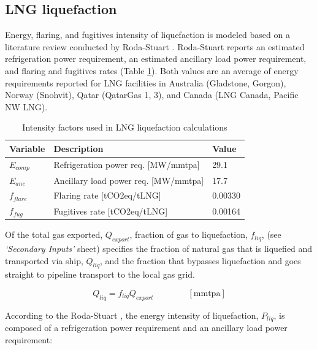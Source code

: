 \documentclass[11pt]{report}
\newcommand{\sheet}[1]{\textit{`{#1}'}}
\newcommand{\eqnunit}[1]{\quad\quad \scriptstyle{\left[\text{#1}\right]}}
\begin{document}
\subsection{LNG liquefaction}

Energy, flaring, and fugitives intensity of liquefaction is modeled based on a literature review conducted by Roda-Stuart \cite{RodaStuart2018}. Roda-Stuart reports an estimated refrigeration power requirement, an estimated ancillary load power requirement, and flaring and fugitives rates (Table \ref{tab:liquefaction}). Both values are an average of energy requirements reported for LNG facilities in Australia (Gladstone, Gorgon), Norway (Snohvit), Qatar (QatarGas 1, 3), and Canada (LNG Canada, Pacific NW LNG).

\begin{table}[ht]
\begin{scriptsize}
\caption{Intensity factors used in LNG liquefaction calculations}
\label{tab:liquefaction}
\begin{tabular*}{0.8\columnwidth}{p{}p{}p{}}
\toprule
Variable & Description & Value \\
\midrule
$E_{comp}$ & Refrigeration power req. [MW/mmtpa] & 29.1 \\
$E_{anc}$ & Ancillary load power req. [MW/mmtpa] & 17.7 \\
$f_{flare}$ & Flaring rate [tCO2eq/tLNG] & 0.00330 \\
$f_{fug}$ & Fugitives rate [tCO2eq/tLNG] & 0.00164 \\
\bottomrule
\end{tabular*}
\end{scriptsize}
\end{table}

Of the total gas exported, $Q_{export}$, fraction of gas to liquefaction, $f_{liq}$, (see \sheet{Secondary Inputs} sheet) specifies the fraction of natural gas that is liquefied and transported via ship, $Q_{liq}$, and the fraction that bypasses liquefaction and goes straight to pipeline transport to the local gas grid. 

\begin{equation}
Q_{liq} = f_{liq} Q_{export} \quad\quad\eqnunit{mmtpa}
\end{equation}

According to the Roda-Stuart \cite{RodaStuart2018}, the energy intensity of liquefaction, $P_{liq}$, is composed of a refrigeration power requirement and an ancillary load power requirement:
\end{document}
